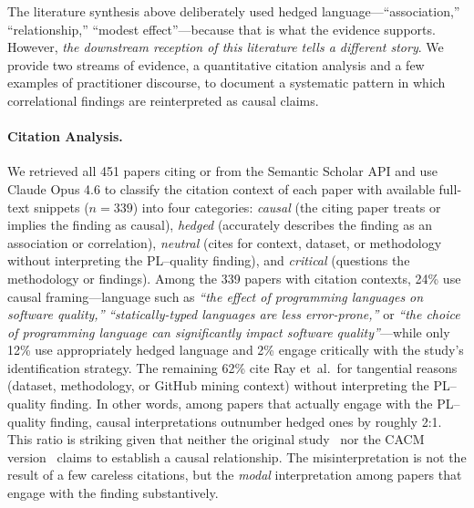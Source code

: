 The literature synthesis above deliberately used hedged language---``association,'' ``relationship,'' ``modest effect''---because that is what the evidence supports.
However, \emph{the downstream reception of this literature tells a different story}.
We provide two streams of evidence, a quantitative citation analysis and a few examples of practitioner discourse, to document a systematic pattern in which correlational findings are reinterpreted as causal claims.

\paragraph{Citation Analysis.}
We retrieved all 451 papers citing \citet{DBLP:conf/sigsoft/RayPFD14} or \citet{DBLP:journals/cacm/RayPDF17} from the Semantic Scholar API and use Claude Opus 4.6 to classify the citation context of each paper with available full-text snippets ($n = 339$) into four categories: \emph{causal} (the citing paper treats or implies the finding as causal), \emph{hedged} (accurately describes the finding as an association or correlation), \emph{neutral} (cites for context, dataset, or methodology without interpreting the PL--quality finding), and \emph{critical} (questions the methodology or findings).
Among the 339 papers with citation contexts, 24\% use causal framing---language such as \emph{``the effect of programming languages on software quality,''} \emph{``statically-typed languages are less error-prone,''} or \emph{``the choice of programming language can significantly impact software quality''}---while only 12\% use appropriately hedged language and 2\% engage critically with the study's identification strategy.
The remaining 62\% cite Ray et~al.\ for tangential reasons (dataset, methodology, or GitHub mining context) without interpreting the PL--quality finding.
In other words, among papers that actually engage with the PL--quality finding, causal interpretations outnumber hedged ones by roughly 2:1.
This ratio is striking given that neither the original study~\cite{DBLP:conf/sigsoft/RayPFD14} nor the CACM version~\cite{DBLP:journals/cacm/RayPDF17} claims to establish a causal relationship.
The misinterpretation is not the result of a few careless citations, but the \emph{modal} interpretation among papers that engage with the finding substantively.

